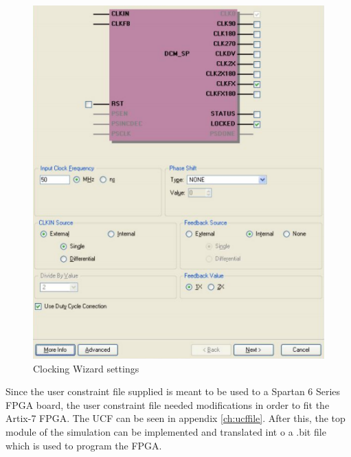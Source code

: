 \begin{figure}
\centering
\includegraphics[scale=0.7]{figures/clock_creation.PNG}
\caption{Clocking Wizard settings } 
\label{fig:clock}
\end{figure}

Since the user constraint file supplied is meant to be used to a Spartan 6 Series FPGA board, the user constraint file needed modifications in order to fit the Artix-7 FPGA. The UCF can be seen in appendix \ref{ch:ucffile}. After this, the top module of the simulation can be implemented and translated int o a .bit file which is used to program the FPGA.

